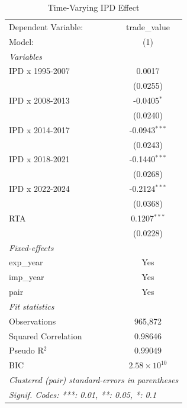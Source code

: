 
\begin{table}[htbp]
   \caption{Time-Varying IPD Effect}
   \centering
   \begin{tabular}{lc}
      \tabularnewline \midrule \midrule
      Dependent Variable: & trade\_value\\   
      Model:              & (1)\\  
      \midrule
      \emph{Variables}\\
      IPD x 1995-2007     & 0.0017\\   
                          & (0.0255)\\   
      IPD x 2008-2013     & -0.0405$^{*}$\\   
                          & (0.0240)\\   
      IPD x 2014-2017     & -0.0943$^{***}$\\   
                          & (0.0243)\\   
      IPD x 2018-2021     & -0.1440$^{***}$\\   
                          & (0.0268)\\   
      IPD x 2022-2024     & -0.2124$^{***}$\\   
                          & (0.0368)\\   
      RTA                 & 0.1207$^{***}$\\   
                          & (0.0228)\\   
      \midrule
      \emph{Fixed-effects}\\
      exp\_year           & Yes\\  
      imp\_year           & Yes\\  
      pair                & Yes\\  
      \midrule
      \emph{Fit statistics}\\
      Observations        & 965,872\\  
      Squared Correlation & 0.98646\\  
      Pseudo R$^2$        & 0.99049\\  
      BIC                 & $2.58\times 10^{10}$\\   
      \midrule \midrule
      \multicolumn{2}{l}{\emph{Clustered (pair) standard-errors in parentheses}}\\
      \multicolumn{2}{l}{\emph{Signif. Codes: ***: 0.01, **: 0.05, *: 0.1}}\\
   \end{tabular}
\end{table}


